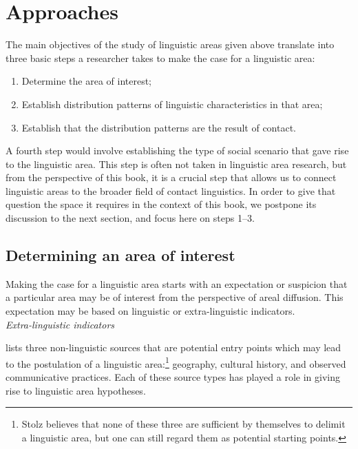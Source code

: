 \documentclass[output=paper,
modfonts
]{langscibook}
\begin{document}
\section{Approaches} \label{sec-approaches}

The main objectives of the study of linguistic areas given above translate into three basic steps a researcher takes to make the case for a linguistic area: 

\begin{enumerate}
\setlength{\itemsep}{0.0\baselineskip}
\item Determine the area of interest;
\item Establish distribution patterns of linguistic characteristics in that area;
\item Establish that the distribution patterns are the result of contact.
\end{enumerate}

A fourth step would involve establishing the type of social scenario that gave rise to the linguistic area. This step is often not taken in linguistic area research, but from the perspective of this book, it is a crucial step that allows us to connect linguistic areas to the broader field of contact linguistics. In order to give that question the space it requires in the context of this book, we postpone its discussion to the next section, and focus here on steps 1--3. 

\subsection{Determining an area of interest}

Making the case for a linguistic area starts with an expectation or suspicion that a particular area may be of interest from the perspective of areal diffusion. This expectation may be based on linguistic or extra-linguistic indicators.\\

\noindent \textit{Extra-linguistic indicators}
\label{subsec:Extra-linguistic indicators}

\noindent \cite{Stolz2006All} lists three non-linguistic sources that are potential entry points which may lead to the postulation of a linguistic area:\footnote{Stolz believes that none of these three are sufficient by themselves to delimit a linguistic area, but one can still regard them as potential starting points.} geography, cultural history, and observed communicative practices. Each of these source types has played a role in giving rise to linguistic area hypotheses. 
\end{document}
